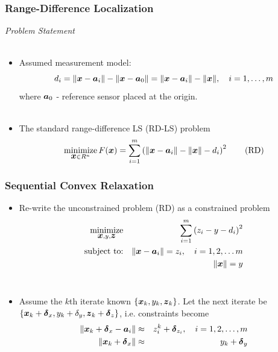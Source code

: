 \documentclass [t] {beamer} %
\begin{document}
\begin{frame} %
\frametitle{Range-Difference Localization} %
{\large \textit{Problem Statement}}
\\~\\
\normalsize
\begin{itemize}
\item 
Assumed measurement model:
 \begin{equation} 
 \nonumber
 d_i=\|\mbox{\boldmath$x$}-\mbox{\boldmath$a$}_i\|-\|\mbox{\boldmath$x$}-\mbox{\boldmath$a$}_0\|=\|\mbox{\boldmath$x$}-\mbox{\boldmath$a$}_i\|-\|\mbox{\boldmath$x$}\|, \quad i = 1,\ldots,m
 \end{equation}
where $\mbox{\boldmath$a$}_0$ - reference sensor placed at the origin.\\~\\
 \item 
 The standard range-difference LS (RD-LS) problem 
 \begin{equation} \label{RD}
\mathop{\mbox{minimize}}_{\mbox{\boldmath$x$} \in R^n} F(\mbox{\boldmath$x$})=\sum_{i=1}^m \left(\|\mbox{\boldmath$x$}-\mbox{\boldmath$a$}_i\| - \|\mbox{\boldmath$x$}\| -d_i\right)^2 \tag{RD}
 \end{equation}
 \end{itemize}
\end{frame}


\begin{frame} %
\frametitle{Sequential Convex Relaxation}
\phantom{m}
\begin{itemize}
\item
Re-write the unconstrained problem (RD) as a constrained problem
\begin{eqnarray} 
\nonumber
\mathop{\mbox{minimize}}_{\mbox{\boldmath$x$}, y, \mbox{\boldmath$z$}} & & \sum^m_{i=1}\left( z_i - y - d_i\right)^2\\
\nonumber
\mbox{subject to:}& &\|\mbox{\boldmath$x$} - \mbox{\boldmath$a$}_i\| = z_i, \quad  i = 1, 2, \ldots m \\
\nonumber
& &\|\mbox{\boldmath$x$}\|  = y
\end{eqnarray}
\\
\item
Assume the $k$th iterate known $\lbrace\mbox{\boldmath$x$}_k, y_k, \mbox{\boldmath$z$}_k\rbrace$. Let the next iterate be $\lbrace\mbox{\boldmath$x$}_k +\mbox{\boldmath${\delta}$}_x, y_k + \delta_y, \mbox{\boldmath$z$}_k + \mbox{\boldmath${\delta}$}_z\rbrace$, i.e. constraints become
\begin{eqnarray}
\nonumber
\|\mbox{\boldmath$x$}_{k} + \mbox{\boldmath${\delta}$}_x - \mbox{\boldmath$a$}_i\| &\approx &z_i^{k} + \mbox{\boldmath${\delta}$}_{z_i}, \quad i = 1, 2, \ldots, m \\
\nonumber
\|\mbox{\boldmath$x$}_{k} + \mbox{\boldmath${\delta}$}_x\| &\approx &y_{k}  + \mbox{\boldmath${\delta}$}_y
\end{eqnarray}

\end{itemize}
\end{frame}
\end{document}
